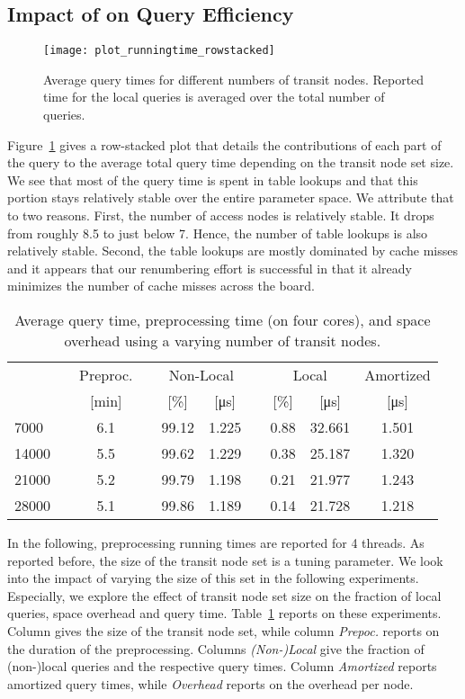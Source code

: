 \documentclass{llncs}
\begin{document}
\subsection{Impact of  on Query Efficiency}
\begin{figure}[tb]
    \centering
    \texttt{[image: plot\_runningtime\_rowstacked]}
    \caption{Average query times for different numbers of transit nodes.  Reported time for the local queries is averaged over the total number of queries.}
    \label{fig:plotRunningTime}
\end{figure}
Figure~\ref{fig:plotRunningTime} gives a row-stacked plot that details the contributions of each part of the query to the average total query time depending on the transit node set size.
We see that most of the query time is spent in table lookups and that this portion stays relatively stable over the entire parameter space.
We attribute that to two reasons.
First, the number of access nodes is relatively stable.
It drops from roughly 8.5 to just below 7.
Hence, the number of table lookups is also relatively stable.
Second, the table lookups are mostly dominated by cache misses and it appears that our renumbering effort is successful in that it already minimizes the number of cache misses across the board.

\begin{table}[hbt]
\caption{Average query time, preprocessing time (on four cores), and space overhead using a varying number of transit nodes.}
\label{tab:overallInfo}
\centering
\begin{tabular}{lccccccccc}
\toprule 
	& & Preproc. & & \multicolumn{2}{c}{Non-Local} & & \multicolumn{2}{c}{Local} & Amortized \\\cline{5-6}\cline{8-9}
 & & [\si{\minute}] & & [\%] & [\si{\micro\second}] & & [\%] & [\si{\micro\second}] & [\si{\micro\second}] \\
\midrule
7000  & & 6.1 & & 99.12 & 1.225 & & 0.88 & 32.661 & 1.501 \\
14000 & & 5.5 & & 99.62 & 1.229 & & 0.38 & 25.187 & 1.320 \\
21000 & & 5.2 & & 99.79 & 1.198 & & 0.21 & 21.977 & 1.243 \\
28000 & & 5.1 & & 99.86 & 1.189 & & 0.14 & 21.728 & 1.218 \\
\bottomrule 
\end{tabular}
\end{table}

In the following, preprocessing running times are reported for 4 threads.
As reported before, the size of the transit node set is a tuning parameter.
We look into the impact of varying the size of this set in the following experiments.
Especially, we explore the effect of transit node set size on the fraction of local queries, space overhead and query time.
Table~\ref{tab:overallInfo} reports on these experiments. 
Column  gives the size of the transit node set, while column \emph{Prepoc.} reports on the duration of the preprocessing.
Columns \emph{(Non-)Local} give the fraction of (non-)local queries and the respective query times.
Column \emph{Amortized} reports amortized query times, while \emph{Overhead} reports on the overhead per node.
\end{document}
